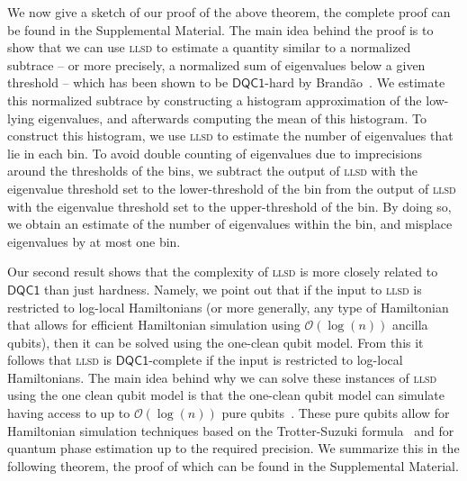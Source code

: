 \documentclass[a4paper, onecolumn, accepted=2022-08-28]{quantumarticle}
\newcommand{\bigO}[1]{\mathcal{O}\left( #1 \right)}
\begin{document}
We now give a sketch of our proof of the above theorem, the complete proof can be found in the Supplemental Material.
The main idea behind the proof is to show that we can use \textsc{llsd} to estimate a quantity similar to a normalized subtrace -- or more precisely, a normalized sum of eigenvalues below a given threshold -- which has been shown to be $\mathsf{DQC1}$-hard by Brand\~{a}o~\cite{brandao:thesis}.
We estimate this normalized subtrace by constructing a histogram approximation of the low-lying eigenvalues, and afterwards computing the mean of this histogram.
To construct this histogram, we use \textsc{llsd} to estimate the number of eigenvalues that lie in each bin.
To avoid double counting of eigenvalues due to imprecisions around the thresholds of the bins, we subtract the output of \textsc{llsd} with the eigenvalue threshold set to the lower-threshold of the bin from the output of \textsc{llsd} with the eigenvalue threshold set to the upper-threshold of the bin. 
By doing so, we obtain an estimate of the number of eigenvalues within the bin, and misplace eigenvalues by at most one bin\footnotemark[1].

Our second result shows that the complexity of \textsc{llsd} is more closely related to $\mathsf{DQC1}$ than just hardness.
Namely, we point out that if the input to \textsc{llsd} is restricted to log-local Hamiltonians (or more generally, any type of Hamiltonian that allows for efficient Hamiltonian simulation using $\bigO{\log(n)}$ ancilla qubits), then it can be solved using the one-clean qubit model.
From this it follows that \textsc{llsd} is $\mathsf{DQC1}$-complete if the input is restricted to log-local Hamiltonians.
The main idea behind why we can solve these instances of \textsc{llsd} using the one clean qubit model is that the one-clean qubit model can simulate having access to up to $\bigO{\log(n)}$ pure qubits~\cite{shor:dqc1}.
These pure qubits allow for Hamiltonian simulation techniques based on the Trotter-Suzuki formula~\cite{lloyd:hs} and for quantum phase estimation up to the required precision.
We summarize this in the following theorem, the proof of which can be found in the Supplemental Material.
\end{document}
